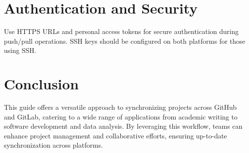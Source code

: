 \documentclass[12pt]{article}
\begin{document}
\section{Authentication and Security}
Use HTTPS URLs and personal access tokens for secure authentication during push/pull operations. SSH keys should be configured on both platforms for those using SSH.

\section{Conclusion}
This guide offers a versatile approach to synchronizing projects across GitHub and GitLab, catering to a wide range of applications from academic writing to software development and data analysis. By leveraging this workflow, teams can enhance project management and collaborative efforts, ensuring up-to-date synchronization across platforms.
\end{document}
